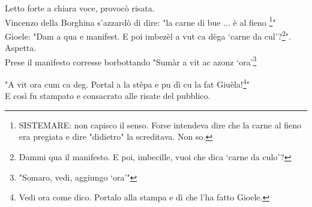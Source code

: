 \documentclass[10pt]{memoir} %
\begin{document}
 \normalsize \normalfont 

Letto forte a chiara voce, provocò risata.\\
 Vincenzo della Borghina s'azzardò di dire: "la carne di bue ... è al fieno \footnote{SISTEMARE: non capisco il senso. Forse intendeva dire che la carne al fieno era pregiata e dire "didietro" la screditava. Non so.}"\\
Gioele: "Dam a qua e manifest. E poi imbezèl a vut ca dèga ‘carne da cul'?\footnote{Dammi qua il manifesto. E poi, imbecille, vuoi che dica ‘carne da culo'?}". \\Aspetta.\\Prese il manifesto corresse borbottando "Sumàr a vit ac azonz ‘ora'\footnote{"Somaro, vedi, aggiungo ‘ora'"}

 \normalsize \normalfont
"A vit ora cum ca deg. Portal a la stêpa e pu dì cu la fat Giuèla!\footnote{Vedi ora come dico. Portalo alla stampa e dì che l'ha fatto Gioele.}"\\
E così fu stampato e consacrato alle risate del pubblico.

\end{document}
